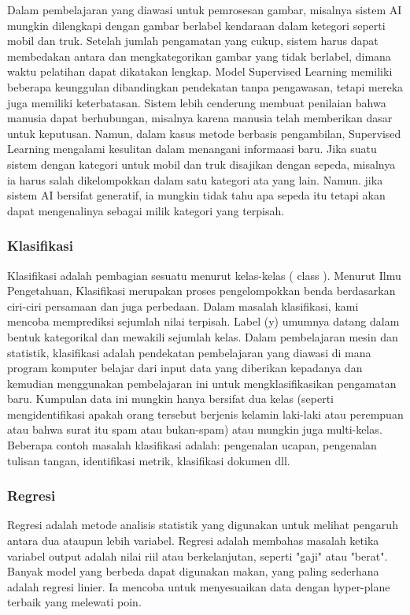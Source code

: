 Dalam pembelajaran yang diawasi untuk pemrosesan gambar, misalnya sistem AI mungkin dilengkapi dengan gambar berlabel kendaraan dalam ketegori seperti mobil dan truk. Setelah jumlah pengamatan yang cukup, sistem harus dapat membedakan antara dan mengkategorikan gambar yang tidak berlabel, dimana waktu pelatihan dapat dikatakan lengkap. Model Supervised Learning memiliki beberapa keunggulan dibandingkan pendekatan tanpa pengawasan, tetapi mereka juga memiliki keterbatasan. Sistem lebih cenderung membuat penilaian bahwa manusia dapat berhubungan, misalnya karena manusia telah memberikan dasar untuk keputusan. Namun, dalam kasus metode berbasis pengambilan, Supervised Learning mengalami kesulitan dalam menangani informaasi baru. Jika suatu sistem dengan kategori untuk mobil dan truk disajikan dengan sepeda, misalnya ia harus salah dikelompokkan dalam satu kategori ata yang lain. Namun. jika sistem AI bersifat generatif, ia mungkin tidak tahu apa sepeda itu tetapi akan dapat mengenalinya sebagai milik kategori yang terpisah.

\subsubsection{Klasifikasi}
Klasifikasi adalah pembagian sesuatu menurut kelas-kelas ( class ). Menurut Ilmu Pengetahuan, Klasifikasi merupakan proses pengelompokkan benda berdasarkan ciri-ciri persamaan dan juga perbedaan. Dalam masalah klasifikasi, kami mencoba memprediksi sejumlah nilai terpisah. Label (y) umumnya datang dalam bentuk kategorikal dan mewakili sejumlah kelas. Dalam pembelajaran mesin dan statistik, klasifikasi adalah pendekatan pembelajaran yang diawasi di mana program komputer belajar dari input data yang diberikan kepadanya dan kemudian menggunakan pembelajaran ini untuk mengklasifikasikan pengamatan baru. Kumpulan data ini mungkin hanya bersifat dua kelas (seperti mengidentifikasi apakah orang tersebut berjenis kelamin laki-laki atau perempuan atau bahwa surat itu spam atau bukan-spam) atau mungkin juga multi-kelas. Beberapa contoh masalah klasifikasi adalah: pengenalan ucapan, pengenalan tulisan tangan, identifikasi metrik, klasifikasi dokumen dll.

\subsubsection{Regresi}
Regresi adalah metode analisis statistik yang digunakan untuk melihat pengaruh antara dua ataupun lebih variabel. Regresi adalah membahas masalah ketika variabel output adalah nilai riil atau berkelanjutan, seperti "gaji" atau "berat". Banyak model yang berbeda dapat digunakan makan, yang paling sederhana adalah regresi linier. Ia mencoba untuk menyesuaikan data dengan hyper-plane terbaik yang melewati poin.

